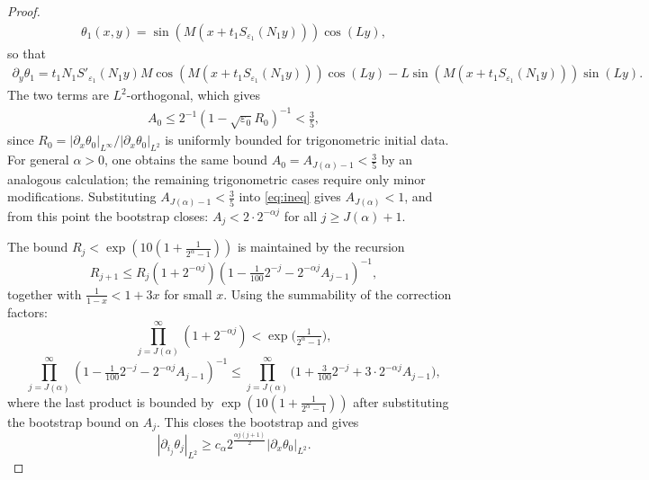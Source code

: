 \documentclass[12pt]{report}   %
\renewcommand{\le}{\leqslant}
\renewcommand{\ge}{\geqslant}
\numberwithin{equation}{section}
\theoremstyle{plain}
\theoremstyle{definition}
\theoremstyle{remark}
\newcommand{\eps}{{\varepsilon}}
\newcommand{\rd}{\partial}
\begin{document}
\begin{proof}
\begin{equation*}
\begin{split}
	\theta_1(x,y) = \sin( M(x+t_1S_{\eps_1 }(N_1y) ) )\cos(Ly),
	\end{split}
	\end{equation*}
so that
\begin{equation*}
	\begin{split}
	\rd_y \theta_1 = t_1N_1S'_{\eps_1}(N_1y)M\cos( M(x+t_1S_{\eps_1 }(N_1y) ) )\cos(Ly) - L\sin( M(x+t_1S_{\eps_1 }(N_1y) ) )\sin(Ly).
	\end{split}
	\end{equation*}
The two terms are $L^2$-orthogonal, which gives
\begin{equation*}
	\begin{split}
	A_0 \le 2^{-1}(1- \sqrt{\eps_0}R_0)^{-1} < \frac{3}{5},
	\end{split}
	\end{equation*}
since $R_0 = |\rd_x\theta_0|_{L^\infty}/|\rd_x\theta_0|_{L^2}$ is uniformly bounded for trigonometric initial data. For general $\alpha > 0$, one obtains the same bound $A_0 = A_{ J(\alpha)-1} < \frac{3}{5}$ by an analogous calculation; the remaining trigonometric cases require only minor modifications.
Substituting $A_{J(\alpha)-1} < \frac{3}{5}$ into \eqref{eq:ineq} gives $A_{ {J(\alpha)} }< 1$, and from this point the bootstrap closes: $A_j<2\cdot 2^{-{\alpha}j}$ for all $j\ge {J(\alpha)+1}$.

The bound $R_j<{\exp(10(1 + \frac{1}{2^\alpha-1}))}$ is maintained by the recursion
\[R_{j+1}\le R_j(1+2^{-{\alpha}j})(1-\tfrac{1}{100}2^{-j}-2^{-{\alpha}j} A_{j-1})^{-1},\]
together with $\frac{1}{1-x}<1+3x$ for small $x$. Using the summability of the correction factors:
\[\prod_{j=J(\alpha)}^\infty (1+2^{-{\alpha}j})<  {\exp\!\Big(\tfrac{1}{2^\alpha-1}\Big)}, \]
\[\prod_{j=J(\alpha)}^\infty (1-\tfrac{1}{100}2^{-j}-2^{-{\alpha} j} A_{j-1})^{-1}\le \prod_{j=J(\alpha)}^\infty\Big(1+\tfrac{3}{100}2^{-j}+3\cdot 2^{-{\alpha}j} A_{j-1}\Big),\]
where the last product is bounded by $\exp(10(1 + \frac{1}{2^\alpha-1}))$ after substituting the bootstrap bound on $A_j$.
This closes the bootstrap and gives \[|\partial_{i_j}\theta_{j}|_{L^2}\ge {c_\alpha} 2^{\frac{{\alpha}j(j+1)}{2}}{|\rd_x\theta_0|_{L^2}}.\]
\medskip


\end{proof}
\end{document}
